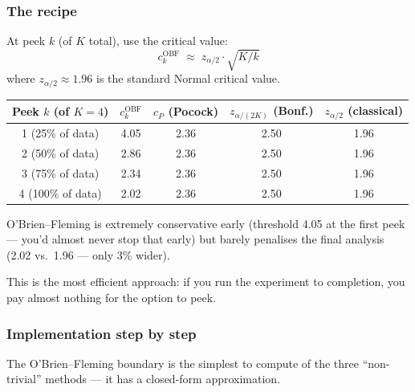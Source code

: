 \documentclass[12pt, a4paper]{article}
\begin{document}
\subsubsection*{The recipe}

At peek $k$ (of $K$ total), use the critical value:
\[
  c_k^{\text{OBF}} \;\approx\; z_{\alpha/2} \cdot \sqrt{K/k}
\]
where $z_{\alpha/2} \approx 1.96$ is the standard Normal critical value.

\begin{center}
\renewcommand{\arraystretch}{1.3}
\begin{tabular}{@{} c c c c c @{}}
\toprule
Peek $k$ (of $K{=}4$) & $c_k^{\text{OBF}}$ & $c_P$ (Pocock) &
  $z_{\alpha/(2K)}$ (Bonf.) & $z_{\alpha/2}$ (classical) \\
\midrule
1 (25\% of data) & 4.05 & 2.36 & 2.50 & 1.96 \\
2 (50\% of data) & 2.86 & 2.36 & 2.50 & 1.96 \\
3 (75\% of data) & 2.34 & 2.36 & 2.50 & 1.96 \\
4 (100\% of data) & 2.02 & 2.36 & 2.50 & 1.96 \\
\bottomrule
\end{tabular}
\end{center}

\begin{plainlanguage}
O'Brien--Fleming is extremely conservative early (threshold 4.05 at the
first peek --- you'd almost never stop that early) but barely penalises
the final analysis (2.02 vs.\ 1.96 --- only 3\% wider).

This is the most efficient approach: if you run the experiment to completion,
you pay almost nothing for the option to peek.
\end{plainlanguage}

\subsubsection*{Implementation step by step}

The O'Brien--Fleming boundary is the simplest to compute of the three
``non-trivial'' methods --- it has a closed-form approximation.
\end{document}
